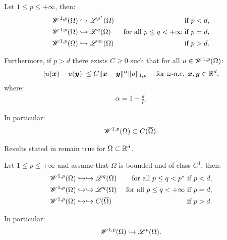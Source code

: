 \begin{corollary}
    Let $1 \leq p \leq +\infty$, then:
    \begin{align}
        \mathscr{W}^{1, p}(\Omega) & \hookrightarrow \mathscr{L}^{p^{\star}}(\Omega) & \text{ if } p < d, \\
        \mathscr{W}^{1, p}(\Omega) & \hookrightarrow \mathscr{L}^{q}(\Omega) &\text{ for all } p \leq q < +\infty \text{ if } p = d, \\
        \mathscr{W}^{1, p}(\Omega) & \hookrightarrow \mathscr{L}^{\infty}(\Omega) & \text{ if } p > d.
    \end{align}

    Furthermore, if $p > d$ there exists $C \geq 0$ such that for all $u \in \mathscr{W}^{1, p}(\Omega)$:
    \begin{align}
        \lvert u(\bm{x}) - u(\bm{y}) \rvert &\leq C \lVert \bm{x} - \bm{y} \rVert^{\alpha} \lVert u \rVert_{1, p} &\text{ for } \omega \text{-a.e. } \bm{x}, \bm{y} \in \mathbb{R}^{d},
    \end{align}
    where:
    \begin{align}
        \alpha = 1 - \frac{d}{p}.
    \end{align}

    In particular:
    \begin{align}
        \mathscr{W}^{1, p}(\Omega) \subset C(\overline{\Omega}).
    \end{align}
\end{corollary}

\begin{corollary}
    Results stated in  remain true for $\Omega \subset \mathbb{R}^{d}$.
\end{corollary}

\begin{theorem}
    Let $1 \leq p \leq +\infty$ and assume that $\Omega$ is bounded and of class $C^1$, then:
    \begin{align}
        \mathscr{W}^{1, p}(\Omega) & \hookrightarrow \hookrightarrow \mathscr{L}^{q}(\Omega) &\text{ for all } p \leq q < p^{\star} \text{ if } p < d, \\
        \mathscr{W}^{1, p}(\Omega) & \hookrightarrow \hookrightarrow \mathscr{L}^{q}(\Omega) &\text{ for all } p \leq q < +\infty \text{ if } p = d, \\
        \mathscr{W}^{1, p}(\Omega) & \hookrightarrow \hookrightarrow C(\overline{\Omega}) & \text{ if } p > d.
    \end{align}

    In particular:
    \begin{align}
        \mathscr{W}^{1, p}(\Omega) \hookrightarrow \mathscr{L}^{p}(\Omega).
    \end{align}
\end{theorem}

